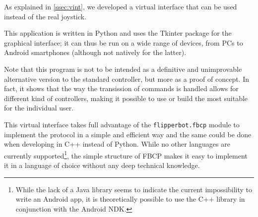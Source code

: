 As explained in \autoref{ssec:vint}, we developed a virtual interface that can
be used instead of the real joystick.

This application is written in Python and uses the Tkinter package for the
graphical interface; it can thus be run on a wide range of devices, from PCs
to Android smartphones (although not natively for the latter).

Note that this program is not to be intended as a definitive and unimprovable
alternative version to the standard controller, but more as a proof of concept.
In fact, it shows that the way the transission of commands is handled allows for
different kind of controllers, making it possible to use or build the most
suitable for the individual user.

This virtual interface takes full advantage of the \Verb|flipperbot.fbcp|
module to implement the protocol in a simple and efficient way and the same
could be done when developing in C++ instead of Python. While no other languages
are currently supported\footnote{While the lack of a Java library seems to
indicate the current impossibility to write an Android app, it is theoretically
possible to use the C++ library in conjunction with the Android NDK.}, the simple structure of FBCP makes it easy
to implement it in a language of choice without any deep technical knowledge.
